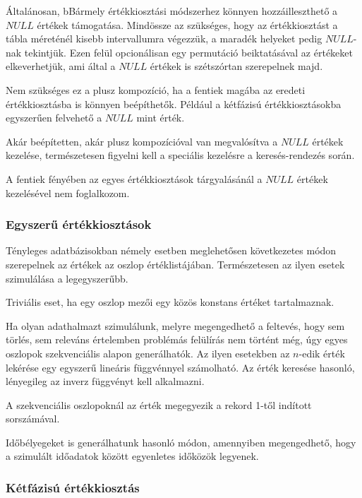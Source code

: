 \documentclass[
    parspace, %
    noindent, %
]{elteiktdk}[2023/10/30]
\begin{document}
Általánosan, bBármely értékkiosztási módszerhez könnyen hozzáilleszthető a $NULL$ értékek támogatása.
Mindössze az szükséges, hogy az értékkiosztást a tábla méreténél kisebb intervallumra végezzük,
a maradék helyeket pedig $NULL$-nak tekintjük.
Ezen felül opcionálisan egy permutáció beiktatásával az értékeket elkeverhetjük,
ami által a $NULL$ értékek is szétszórtan szerepelnek majd.

Nem szükséges ez a plusz kompozíció,
ha a fentiek magába az eredeti értékkiosztásba is könnyen beépíthetők.
Például a kétfázisú értékkiosztásokba egyszerűen felvehető a $NULL$ mint érték.

Akár beépítetten, akár plusz kompozícióval van megvalósítva a $NULL$ értékek kezelése,
természetesen figyelni kell a speciális kezelésre a keresés-rendezés során.

A fentiek fényében az egyes értékkiosztások tárgyalásánál a $NULL$ értékek kezelésével nem foglalkozom.

\subsubsection{Egyszerű értékkiosztások}

Tényleges adatbázisokban némely esetben meglehetősen következetes módon
szerepelnek az értékek az oszlop értéklistájában.
Természetesen az ilyen esetek szimulálása a legegyszerűbb.

Triviális eset, ha egy oszlop mezői egy közös konstans értéket tartalmaznak.

Ha olyan adathalmazt szimulálunk, melyre megengedhető a feltevés,
hogy sem törlés, sem releváns értelemben problémás felülírás nem történt még,
úgy egyes oszlopok szekvenciális alapon generálhatók.
Az ilyen esetekben az $n$-edik érték lekérése
egy egyszerű lineáris függvénnyel számolható.
Az érték keresése hasonló, lényegileg az inverz függvényt kell alkalmazni.

A szekvenciális oszlopoknál az érték megegyezik a rekord 1-től indított sorszámával.

Időbélyegeket is generálhatunk hasonló módon,
amennyiben megengedhető, hogy a szimulált időadatok között egyenletes időközök legyenek.

\subsubsection{Kétfázisú értékkiosztás}

\end{document}
